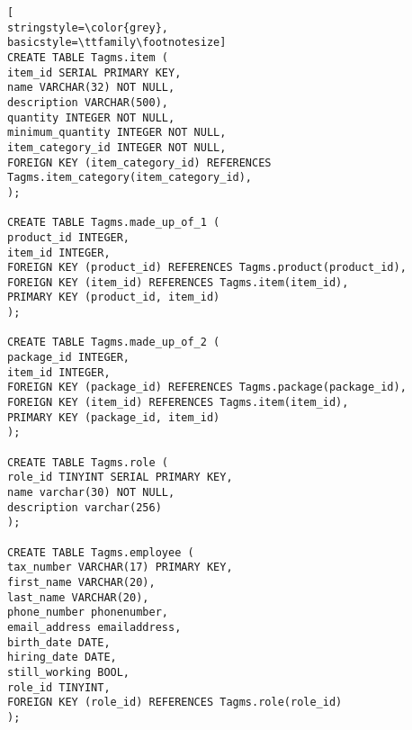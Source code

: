 \begin{lstlisting}[
stringstyle=\color{grey},
basicstyle=\ttfamily\footnotesize]
CREATE TABLE Tagms.item (
item_id SERIAL PRIMARY KEY,
name VARCHAR(32) NOT NULL,
description VARCHAR(500),
quantity INTEGER NOT NULL,
minimum_quantity INTEGER NOT NULL,
item_category_id INTEGER NOT NULL,
FOREIGN KEY (item_category_id) REFERENCES Tagms.item_category(item_category_id),
);

CREATE TABLE Tagms.made_up_of_1 (
product_id INTEGER,
item_id INTEGER,
FOREIGN KEY (product_id) REFERENCES Tagms.product(product_id),
FOREIGN KEY (item_id) REFERENCES Tagms.item(item_id),
PRIMARY KEY (product_id, item_id)
);

CREATE TABLE Tagms.made_up_of_2 (
package_id INTEGER,
item_id INTEGER,
FOREIGN KEY (package_id) REFERENCES Tagms.package(package_id),
FOREIGN KEY (item_id) REFERENCES Tagms.item(item_id),
PRIMARY KEY (package_id, item_id)
);

CREATE TABLE Tagms.role (
role_id TINYINT SERIAL PRIMARY KEY,
name varchar(30) NOT NULL,
description varchar(256)
);

CREATE TABLE Tagms.employee (
tax_number VARCHAR(17) PRIMARY KEY,
first_name VARCHAR(20),
last_name VARCHAR(20),
phone_number phonenumber,
email_address emailaddress,
birth_date DATE,
hiring_date DATE,
still_working BOOL,
role_id TINYINT,
FOREIGN KEY (role_id) REFERENCES Tagms.role(role_id)
);


\end{lstlisting}